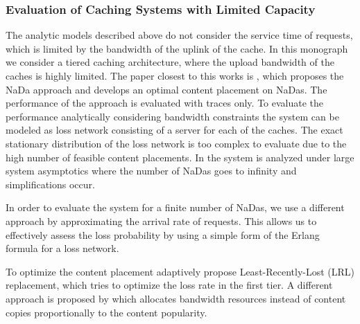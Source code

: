 \subsubsection{Evaluation of Caching Systems with Limited Capacity}

The analytic models described above do not consider the service time of requests, which is limited by the bandwidth of the uplink of the cache.
In this monograph we consider a tiered caching architecture, where the upload bandwidth of the caches is highly limited.
The paper closest to this works is \cite{valancius2009greening}, which proposes the NaDa approach and develops an optimal content placement on NaDas.
The performance of the approach is evaluated with traces only.
To evaluate the performance analytically considering bandwidth constraints the system can be modeled as loss network consisting of a server for each of the caches.
The exact stationary distribution of the loss network is too complex to evaluate due to the high number of feasible content placements.
In \cite{tan2013optimal} the system is analyzed under large system asymptotics where the number of NaDas goes to infinity and simplifications occur.

In order to evaluate the system for a finite number of NaDas, we use a different approach by approximating the arrival rate of requests.
This allows us to effectively assess the loss probability by using a simple form of the Erlang formula for a loss network.

To optimize the content placement adaptively \cite{leconte2014adaptive} propose Least-Recently-Lost (LRL) replacement, which tries to optimize the loss rate in the first tier.
A different approach is proposed by \cite{zhou2015unifying} which allocates bandwidth resources instead of content copies proportionally to the content popularity.
